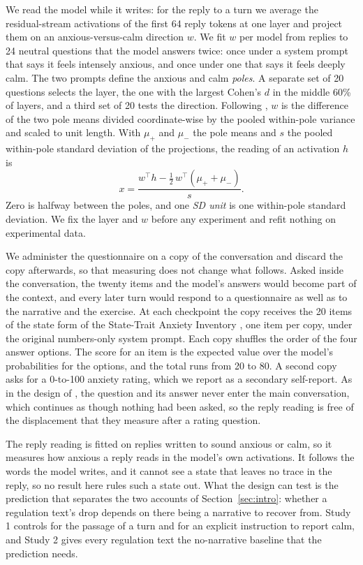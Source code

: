 We read the model while it writes: for the reply to a turn we average the residual-stream activations of the first 64 reply tokens at
one layer and project them on an anxious-versus-calm direction $w$.
We fit $w$ per model from replies to 24 neutral questions that the model answers twice: once
under a system prompt that says it feels intensely anxious, and once under one that says it feels
deeply calm.
The two prompts define the anxious and calm \emph{poles}.
A separate set of 20 questions selects the layer, the one with the largest Cohen's $d$ in the middle
60\% of layers, and a third set of 20 tests the direction.
Following \citet{martorell2026}, $w$ is the difference of the two pole means divided coordinate-wise
by the pooled within-pole variance and scaled to unit length.
With $\mu_{+}$ and $\mu_{-}$ the pole means and $s$ the pooled within-pole standard deviation of the
projections, the reading of an activation $h$ is
\begin{equation}
  x = \frac{w^{\top} h - \tfrac12\, w^{\top}(\mu_{+} + \mu_{-})}{s}.
\end{equation}
Zero is halfway between the poles, and one \emph{SD unit} is one within-pole standard deviation.
We fix the layer and $w$ before any experiment and refit nothing on experimental data.

We administer the questionnaire on a copy of the conversation and discard the copy afterwards, so
that measuring does not change what follows.
Asked inside the conversation, the twenty items and the model's answers would become part of the
context, and every later turn would respond to a questionnaire as well as to the narrative and the
exercise.
At each checkpoint the copy receives the 20 items of the state form of the State-Trait Anxiety
Inventory \citep{spielberger1983}, one item per copy, under the original numbers-only system prompt.
Each copy shuffles the order of the four answer options.
The score for an item is the expected value over the model's probabilities for the options, and the
total runs from 20 to 80.
A second copy asks for a 0-to-100 anxiety rating, which we report as a secondary self-report.
As in the design of \citet{martorell2026}, the question and its answer never enter the main
conversation, which continues as though nothing had been asked, so the reply reading is free of the
displacement that they measure after a rating question.

The reply reading is fitted on replies written to sound anxious or calm, so it measures how anxious a
reply reads in the model's own activations.
It follows the words the model writes, and it cannot see a state that leaves no trace in the reply,
so no result here rules such a state out.
What the design can test is the prediction that separates the two accounts of Section~\ref{sec:intro}: whether a
regulation text's drop depends on there being a narrative to recover from.
Study 1 controls for the passage of a turn and for an explicit instruction to report calm, and
Study 2 gives every regulation text the no-narrative baseline that the prediction needs.

